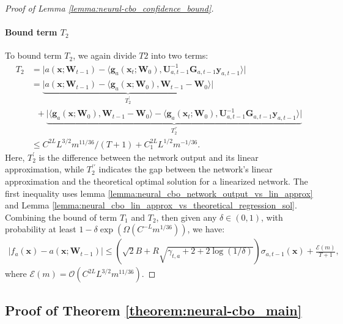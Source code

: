 \begin{proof}[Proof of Lemma \ref{lemma:neural-cbo_confidence_bound}]
\paragraph{Bound term $T_2$}
To bound term $T_2$, we again divide $T2$ into two terms:
\begin{align*}
    T_2 &=\lvert a(\mathbf{x}; \mathbf{W}_{t-1}) - \langle \mathbf{g}_a(\mathbf{x}_{t};\mathbf{W}_{0}),\mathbf{U}_{a,t-1}^{-1}\mathbf{G}_{a,t-1}\mathbf{y}_{a,t-1} \rangle  \rvert 
    \\
    &= \underbrace{\lvert a(\mathbf{x}; \mathbf{W}_{t-1}) - \langle \mathbf{g}_a(\mathbf{x};\mathbf{W}_0), \mathbf{W}_{t-1} - \mathbf{W}_0 \rangle \rvert}_{T_2^\prime} \\
    & \;\; + \underbrace{\lvert \langle \mathbf{g}_a(\mathbf{x};\mathbf{W}_0), \mathbf{W}_{t-1} - \mathbf{W}_0 \rangle  - \langle \mathbf{g}_a(\mathbf{x}_{t};\mathbf{W}_{0}),\mathbf{U}_{a,t-1}^{-1}\mathbf{G}_{a,t-1}\mathbf{y}_{a,t-1} \rangle   \rvert}_{T_2^{\prime \prime}}
    \\
    & \le C^{2L} L^{3/2} m^{11/36}/ (T+1) + C_1^{2L} L^{1/2} m^{-1/36}.
\end{align*}
Here, $T_2^{\prime}$ is the difference between the network output and its linear approximation, while $T_2^{\prime \prime}$ indicates the gap between the network's linear approximation and the theoretical optimal solution for a linearized network. The first inequality uses lemma \ref{lemma:neural_cbo_network_output_vs_lin_approx} and Lemma \ref{lemma:neural_cbo_lin_approx_vs_theoretical_regression_sol}. Combining the bound of term $T_1$ and $T_2$, then given any $\delta \in (0,1)$,  with probability at least $1 - \delta \exp (\Omega(C^{-L} m^{1/36}))$, we have:
\begin{align*}
     \lvert f_a(\mathbf{x}) - a(\mathbf{x}; \mathbf{W}_{t-1}) \rvert \le  \left(\sqrt{2}B + R \sqrt{\gamma_{t,a} + 2 + 2 \log(1/\delta)}\right)\sigma_{a, t-1}(\mathbf{x}) + \frac{\mathcal{E}(m)}{T+1}, 
\end{align*}
where $\mathcal{E}(m) = \mathcal{O}(C^{2L} L^{3/2} m^{11/36})$.
\end{proof}

\subsection{Proof of Theorem \ref{theorem:neural-cbo_main}}

\NeuralCBOTheoremMain*

